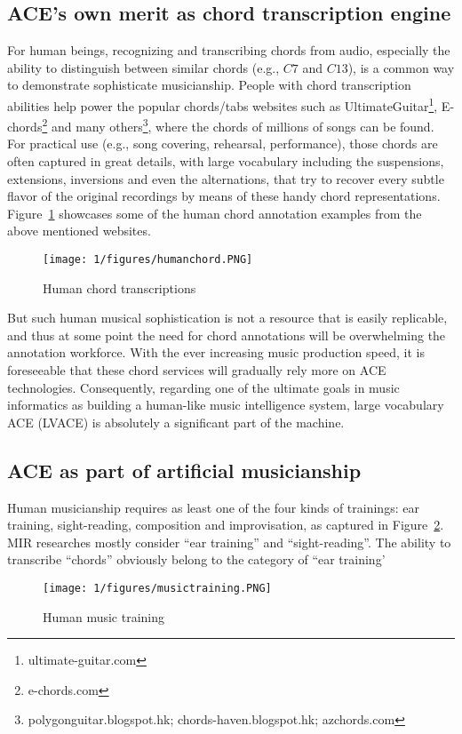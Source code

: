 \subsection{ACE's own merit as chord transcription engine}
For human beings, recognizing and transcribing chords from audio, especially the ability to distinguish between similar chords (e.g., $C7$ and $C13$), is a common way to demonstrate sophisticate musicianship. People with chord transcription abilities help power the popular chords/tabs websites such as UltimateGuitar\footnote{ultimate-guitar.com}, E-chords\footnote{e-chords.com} and many others\footnote{polygonguitar.blogspot.hk; chords-haven.blogspot.hk; azchords.com}, where the chords of millions of songs can be found. For practical use (e.g., song covering, rehearsal, performance), those chords are often captured in great details, with large vocabulary including the suspensions, extensions, inversions and even the alternations, that try to recover every subtle flavor of the original recordings by means of these handy chord representations. Figure~\ref{fig:1-humanchord} showcases some of the human chord annotation examples from the above mentioned websites.
\begin{figure}
\centering
\texttt{[image: 1/figures/humanchord.PNG]}
\caption{Human chord transcriptions}
\label{fig:1-humanchord}
\end{figure}

But such human musical sophistication is not a resource that is easily replicable, and thus at some point the need for chord annotations will be overwhelming the annotation workforce. With the ever increasing music production speed, it is foreseeable that these chord services will gradually rely more on ACE technologies. Consequently, regarding one of the ultimate goals in music informatics as building a human-like music intelligence system, large vocabulary ACE (LVACE) is absolutely a significant part of the machine.

\subsection{ACE as part of artificial musicianship}
Human musicianship requires as least one of the four kinds of trainings: ear training, sight-reading, composition and improvisation, as captured in Figure~\ref{fig:1-musictraining}. MIR researches mostly consider ``ear training'' and ``sight-reading''. The ability to transcribe ``chords'' obviously belong to the category of ``ear training'
\begin{figure}
\centering
\texttt{[image: 1/figures/musictraining.PNG]}
\caption{Human music training}
\label{fig:1-musictraining}
\end{figure}

